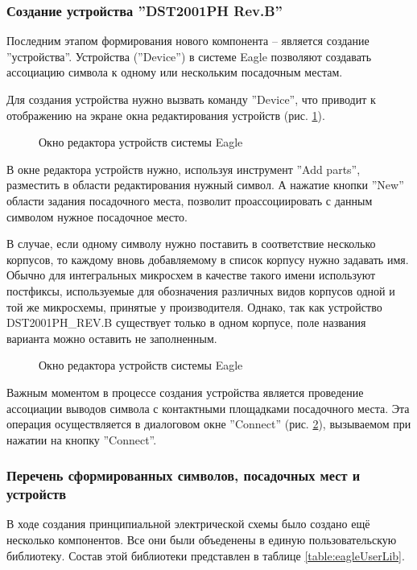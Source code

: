 \subsubsection{Создание устройства ''DST2001PH Rev.B''}
\begin{par}
Последним этапом формирования нового компонента -- является создание ''устройства''.
Устройства (''Device'') в системе Eagle позволяют создавать ассоциацию символа к
одному или нескольким посадочным местам.

Для создания устройства нужно вызвать команду ''Device'', что приводит к отображению на экране
окна редактирования устройств (рис. \ref{img:device}).
\end{par}
\begin{figure}[h]
	\caption{Окно редактора устройств системы Eagle}
	\label{img:device}
\end{figure}

В окне редактора устройств нужно, используя инструмент ''Add parts'', разместить в области
редактирования нужный символ. А нажатие кнопки ''New'' области задания посадочного места,
позволит проассоциировать с данным символом нужное посадочное место.

В случае, если одному символу нужно поставить в соответствие несколько корпусов, то каждому
вновь добавляемому в список корпусу нужно задавать имя. Обычно для интегральных
микросхем в качестве такого имени используют постфиксы, используемые для обозначения
различных видов корпусов одной и той же микросхемы, принятые у производителя. Однако,
так как устройство DST2001PH\_REV.B существует только в одном корпусе, поле названия варианта
можно оставить не заполненным.

\begin{figure}[h]
	\caption{Окно редактора устройств системы Eagle}
	\label{img:devConnect}
\end{figure}
Важным моментом в процессе создания устройства является проведение ассоциации выводов
символа с контактными площадками посадочного места. Эта операция осуществляется
в диалоговом окне ''Connect'' (рис. \ref{img:devConnect}), вызываемом при нажатии на кнопку ''Connect''.

\subsubsection{Перечень сформированных символов, посадочных мест и устройств}
В ходе создания принципиальной электрической схемы было создано ещё несколько
компонентов. Все они были объеденены в единую пользовательскую библиотеку.
Состав этой библиотеки представлен в таблице \ref{table:eagleUserLib}.

